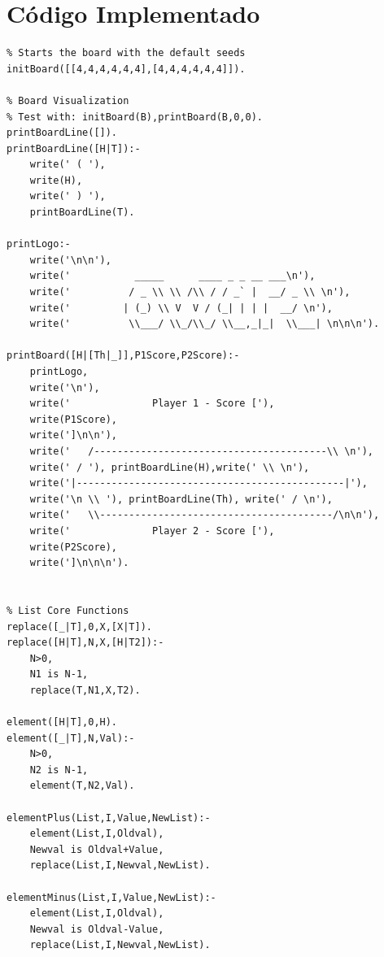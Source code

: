 \documentclass[15pt,a4paper]{article}
\begin{document}
\newpage
\appendix
\section{Código Implementado}
 \begin{verbatim}
% Starts the board with the default seeds
initBoard([[4,4,4,4,4,4],[4,4,4,4,4,4]]).

% Board Visualization
% Test with: initBoard(B),printBoard(B,0,0).
printBoardLine([]).
printBoardLine([H|T]):-
	write(' ( '),
	write(H),
	write(' ) '),
	printBoardLine(T).

printLogo:-
	write('\n\n'),
	write('           _____      ____ _ _ __ ___\n'), 
	write('          / _ \\ \\ /\\ / / _` |  __/ _ \\ \n'),
	write('         | (_) \\ V  V / (_| | | |  __/ \n'),
	write('          \\___/ \\_/\\_/ \\__,_|_|  \\___| \n\n\n').
	
printBoard([H|[Th|_]],P1Score,P2Score):-
	printLogo,
	write('\n'),
	write('              Player 1 - Score ['),
	write(P1Score),
	write(']\n\n'),
	write('   /----------------------------------------\\ \n'),
	write(' / '), printBoardLine(H),write(' \\ \n'),
	write('|----------------------------------------------|'),
	write('\n \\ '), printBoardLine(Th), write(' / \n'),
	write('   \\----------------------------------------/\n\n'),
	write('              Player 2 - Score ['),
	write(P2Score),
	write(']\n\n\n').
	

% List Core Functions
replace([_|T],0,X,[X|T]).
replace([H|T],N,X,[H|T2]):- 
	N>0, 
	N1 is N-1,
	replace(T,N1,X,T2).

element([H|T],0,H).
element([_|T],N,Val):-
	N>0,
	N2 is N-1,
	element(T,N2,Val).

elementPlus(List,I,Value,NewList):-
	element(List,I,Oldval),
	Newval is Oldval+Value,
	replace(List,I,Newval,NewList).
	
elementMinus(List,I,Value,NewList):-
	element(List,I,Oldval),
	Newval is Oldval-Value,
	replace(List,I,Newval,NewList).


\end{verbatim}
\end{document}
